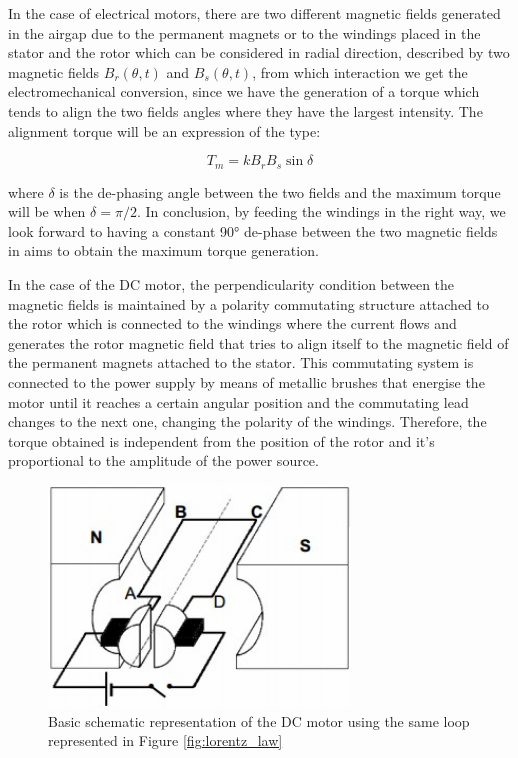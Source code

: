 \begin{description}
In the case of electrical motors, there are two different magnetic fields generated in the airgap due to the permanent magnets or to the windings placed in the stator and the rotor which can be considered in radial direction, described by two magnetic fields $B_{r}(\theta,t)$ and $B_{s}(\theta,t)$, from which interaction we get the electromechanical conversion, since we have the generation of a torque which tends to align the two fields angles where they have the largest intensity. The alignment torque will be an expression of the type:

\begin{equation}
	\label{eq:torque_2}
	T_{m} = k B_{r} B_{s} \sin \delta
\end{equation}

where $\delta$ is the de-phasing angle between the two fields and the maximum torque will be when $\delta = \pi / 2$. In conclusion, by feeding the windings in the right way, we look forward to having a constant 90° de-phase between the two magnetic fields in aims to obtain the maximum torque generation.


\end{description}

In the case of the \acf{DC} motor, the perpendicularity condition between the magnetic fields is maintained by a polarity commutating structure attached to the rotor which is connected to the windings where the current flows and generates the rotor magnetic field that tries to align itself to the magnetic field of the permanent magnets attached to the stator. This commutating system is connected to the power supply by means of metallic brushes that energise the motor until it reaches a certain angular position and the commutating lead changes to the next one, changing the polarity of the windings. Therefore, the torque obtained is independent from the position of the rotor and it’s proportional to the amplitude of the power source.

\begin{figure}[htbp]
\centering
\includegraphics[width=8cm]{Images/dc_motor.png} 
\caption[DC Motor Scheme]{Basic schematic representation of the \ac{DC} motor using the same loop represented in Figure \ref{fig:lorentz_law}}
\label{fig:dc_motor}
\end{figure}


